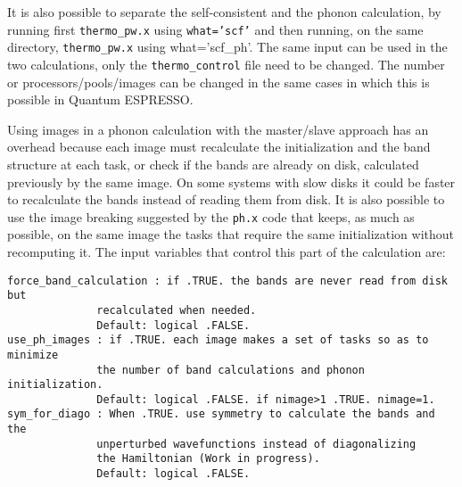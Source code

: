 \documentclass[12pt,a4paper]{article}
\begin{document}
It is also possible to separate the self-consistent and the phonon calculation,
by running first \texttt{thermo\_pw.x} using \texttt{what='scf'} and then
running, on the same directory, \texttt{thermo\_pw.x} using 
{what='scf\_ph'}. The same input can be used in the two calculations, only
the \texttt{thermo\_control} file need to be changed.
The number or processors/pools/images can be changed in the same cases in
which this is possible in Quantum ESPRESSO.

Using images in a phonon calculation with the master/slave approach
has an overhead because each image must recalculate the initialization
and the band structure at each task, or check if the bands are 
already on disk, calculated previously by the same image. On some systems 
with slow disks it could be faster to recalculate the bands instead of 
reading them from disk. It is also possible to use the image breaking
suggested by the \texttt{ph.x} code that keeps, as much as possible, 
on the same image the tasks that require the same initialization without
recomputing it.
The input variables that control this part of the calculation are:
\begin{verbatim}
force_band_calculation : if .TRUE. the bands are never read from disk but
              recalculated when needed.
              Default: logical .FALSE.
use_ph_images : if .TRUE. each image makes a set of tasks so as to minimize
              the number of band calculations and phonon initialization.
              Default: logical .FALSE. if nimage>1 .TRUE. nimage=1.
sym_for_diago : When .TRUE. use symmetry to calculate the bands and the 
              unperturbed wavefunctions instead of diagonalizing 
              the Hamiltonian (Work in progress).
              Default: logical .FALSE.
\end{verbatim}
\end{document}

